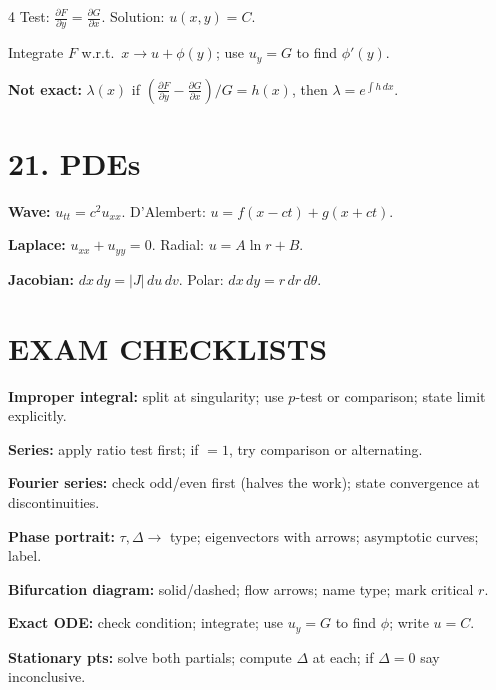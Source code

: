 \documentclass[8pt,a4paper,landscape]{extarticle}
\newcommand{\pf}[2]{\frac{\partial #1}{\partial #2}}
\newcommand{\dx}{\,dx}
\begin{document}
\begin{multicols}{4}
Test: $\pf{F}{y}=\pf{G}{x}$. Solution: $u(x,y)=C$.

Integrate $F$ w.r.t.\ $x\to u+\phi(y)$; use $u_y=G$ to find $\phi'(y)$.

\textbf{Not exact:} $\lambda(x)$ if $(\pf{F}{y}-\pf{G}{x})/G=h(x)$, then $\lambda=e^{\int h\dx}$.

\section*{21. PDEs}

\textbf{Wave:} $u_{tt}=c^2u_{xx}$. D'Alembert: $u=f(x-ct)+g(x+ct)$.

\textbf{Laplace:} $u_{xx}+u_{yy}=0$. Radial: $u=A\ln r+B$.

\textbf{Jacobian:} $dx\,dy=|J|\,du\,dv$. Polar: $dx\,dy=r\,dr\,d\theta$.

\section*{EXAM CHECKLISTS}

\textbf{Improper integral:} split at singularity; use $p$-test or comparison; state limit explicitly.

\textbf{Series:} apply ratio test first; if $=1$, try comparison or alternating.

\textbf{Fourier series:} check odd/even first (halves the work); state convergence at discontinuities.

\textbf{Phase portrait:} $\tau,\Delta\to$ type; eigenvectors with arrows; asymptotic curves; label.

\textbf{Bifurcation diagram:} solid/dashed; flow arrows; name type; mark critical $r$.

\textbf{Exact ODE:} check condition; integrate; use $u_y=G$ to find $\phi$; write $u=C$.

\textbf{Stationary pts:} solve both partials; compute $\Delta$ at each; if $\Delta=0$ say inconclusive.

\end{multicols}
\end{document}
